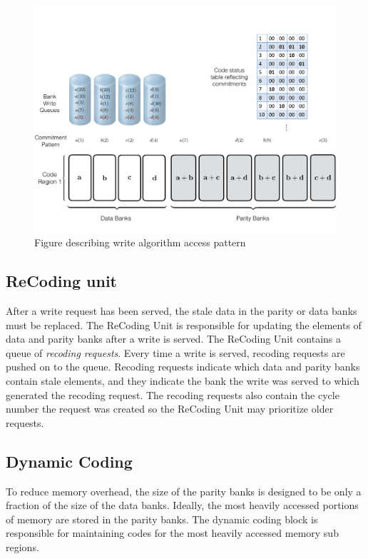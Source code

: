 \begin{figure}[t!]
\centering
         \includegraphics[width=\linewidth]{fig/Write-Algo-Example.pdf}
	\caption{Figure describing write algorithm access pattern}
	\label{fig:writeAlgoAccessPattern}
\end{figure}
\subsection{ReCoding unit}
\label{sec:recoding}
After a write request has been served, the stale data in the parity or data banks must be replaced. The ReCoding Unit is responsible for updating the elements of data and parity banks after a write is served. The ReCoding Unit contains a queue of {\em recoding requests}. Every time a write is served, recoding requests are pushed on to the queue. Recoding requests indicate which data and parity banks contain stale elements, and they indicate the bank the write was served to which generated the recoding request. The recoding requests also contain the cycle number the request was created so the ReCoding Unit may prioritize older requests. 

\subsection{Dynamic Coding}
\label{sec:dynamicCoding}
To reduce memory overhead, the size of the parity banks is designed to be only a fraction of the size of the data banks. Ideally, the most heavily accessed portions of memory are stored in the parity banks. The dynamic coding block is responsible for maintaining codes for the most heavily accessed memory sub regions.

